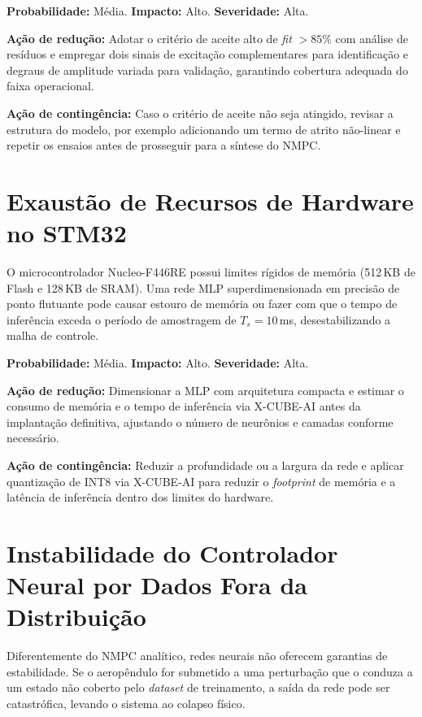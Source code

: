 \textbf{Probabilidade:} Média. \textbf{Impacto:} Alto. \textbf{Severidade:} Alta.

\textbf{Ação de redução:} Adotar o critério de aceite alto de \textit{fit} $> 85\%$ com análise de resíduos e empregar dois sinais de excitação complementares para identificação e degraus de amplitude variada para validação, garantindo cobertura adequada do faixa operacional.

\textbf{Ação de contingência:} Caso o critério de aceite não seja atingido, revisar a estrutura do modelo, por exemplo adicionando um termo de atrito não-linear e repetir os ensaios antes de prosseguir para a síntese do NMPC.

\section{Exaustão de Recursos de Hardware no STM32}

O microcontrolador Nucleo-F446RE possui limites rígidos de memória (512\,KB de Flash e 128\,KB de SRAM). Uma rede MLP superdimensionada em precisão de ponto flutuante pode causar estouro de memória ou fazer com que o tempo de inferência exceda o período de amostragem de $T_s = 10$\,ms, desestabilizando a malha de controle.

\textbf{Probabilidade:} Média. \textbf{Impacto:} Alto. \textbf{Severidade:} Alta.

\textbf{Ação de redução:} Dimensionar a MLP com arquitetura compacta e estimar o consumo de memória e o tempo de inferência via X-CUBE-AI antes da implantação definitiva, ajustando o número de neurônios e camadas conforme necessário.

\textbf{Ação de contingência:} Reduzir a profundidade ou a largura da rede e aplicar quantização de INT8 via X-CUBE-AI para reduzir o \textit{footprint} de memória e a latência de inferência dentro dos limites do hardware.

\section{Instabilidade do Controlador Neural por Dados Fora da Distribuição}

Diferentemente do NMPC analítico, redes neurais não oferecem garantias de estabilidade. Se o aeropêndulo for submetido a uma perturbação que o conduza a um estado não coberto pelo \textit{dataset} de treinamento, a saída da rede pode ser catastrófica, levando o sistema ao colapso físico.

